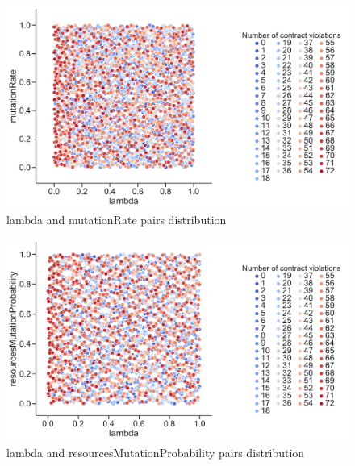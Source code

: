 \clearpage
\begin{figure}
	\centering
	\includegraphics[width=\textwidth]{images/PairsDistr/lambda_mutationRate.pdf}
	\caption[lambda and mutationRate pairs distribution]{lambda and mutationRate pairs distribution}
	\label{fig:lambda_mutationRate_pair}
\end{figure}
\clearpage
\begin{figure}
	\centering
	\includegraphics[width=\textwidth]{images/PairsDistr/lambda_resourcesMutationProbability.pdf}
	\caption[lambda and resourcesMutationProbability pairs distribution]{lambda and resourcesMutationProbability pairs distribution}
	\label{fig:lambda_resourcesMutationProbability_pair}
\end{figure}
\clearpage
